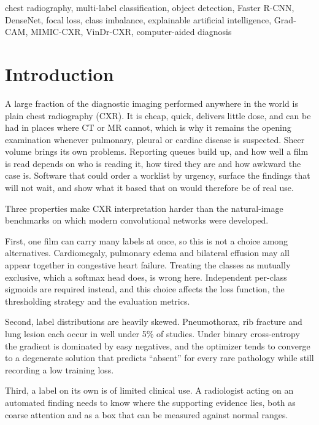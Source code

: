 \documentclass[conference]{IEEEtran}
\begin{document}
\begin{IEEEkeywords}
\normalfont
chest radiography, multi-label classification, object detection, Faster R-CNN,
DenseNet, focal loss, class imbalance, explainable artificial intelligence,
Grad-CAM, MIMIC-CXR, VinDr-CXR, computer-aided diagnosis
\end{IEEEkeywords}

\section{Introduction}

A large fraction of the diagnostic imaging performed anywhere in the world is
plain chest radiography (CXR). It is cheap, quick, delivers little dose, and can
be had in places where CT or MR cannot, which is why it remains the opening
examination whenever pulmonary, pleural or cardiac disease is suspected. Sheer
volume brings its own problems. Reporting queues build up, and how well a film
is read depends on who is reading it, how tired they are and how awkward the
case is. Software that could order a worklist by urgency, surface the findings
that will not wait, and show what it based that on would therefore be of real
use.

Three properties make CXR interpretation harder than the natural-image
benchmarks on which modern convolutional networks were developed.

First, one film can carry many labels at once, so this is not a choice among
alternatives. Cardiomegaly, pulmonary edema and bilateral effusion may all appear
together in congestive heart failure. Treating the classes as mutually exclusive,
which a softmax head does, is wrong here. Independent per-class sigmoids
are required instead, and this choice affects the loss function, the
thresholding strategy and the evaluation metrics.

Second, label distributions are heavily skewed. Pneumothorax, rib fracture and
lung lesion each occur in well under 5\% of studies. Under binary cross-entropy
the gradient is dominated by easy negatives, and the optimizer tends to
converge to a degenerate solution that predicts ``absent'' for every rare
pathology while still recording a low training loss.

Third, a label on its own is of limited clinical use. A radiologist acting on
an automated finding needs to know where the supporting evidence lies, both as
coarse attention and as a box that can be measured against normal ranges.
\end{document}
